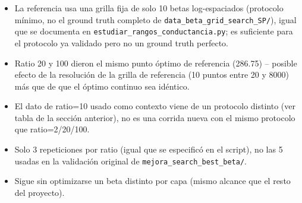 \documentclass[11pt]{article}
\begin{document}
\begin{itemize}
\item La referencia usa una grilla fija de solo 10 betas log-espaciados (protocolo mínimo, no
el ground truth completo de \texttt{data\_beta\_grid\_search\_SP/}), igual que se documenta en
\texttt{estudiar\_rangos\_conductancia.py}; es suficiente para el protocolo ya validado pero no
un ground truth perfecto.
\item Ratio 20 y 100 dieron el mismo punto óptimo de referencia (286.75) -- posible efecto de
la resolución de la grilla de referencia (10 puntos entre 20 y 8000) más que de que el óptimo
continuo sea idéntico.
\item El dato de ratio=10 usado como contexto viene de un protocolo distinto (ver tabla de la
sección anterior), no es una corrida nueva con el mismo protocolo que ratio=2/20/100.
\item Solo 3 repeticiones por ratio (igual que se especificó en el script), no las 5 usadas en
la validación original de \texttt{mejora\_search\_best\_beta/}.
\item Sigue sin optimizarse un beta distinto por capa (mismo alcance que el resto del proyecto).
\end{itemize}
\end{document}
